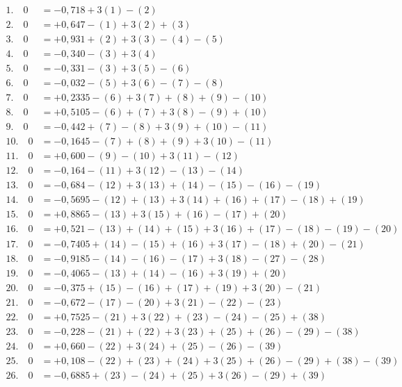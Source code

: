 \documentclass[12pt,a4paper]{article}
\theoremstyle{plain}
\theoremstyle{definition}
\theoremstyle{remark}
\begin{document}
\begin{align*}
1.\quad 0 &= -0{,}718 + 3(1) - (2)\\
2.\quad 0 &= +0{,}647 - (1) + 3(2) + (3)\\
3.\quad 0 &= +0{,}931 + (2) + 3(3) - (4) - (5)\\
4.\quad 0 &= -0{,}340 - (3) + 3(4)\\
5.\quad 0 &= -0{,}331 - (3) + 3(5) - (6)\\
6.\quad 0 &= -0{,}032 - (5) + 3(6) - (7) - (8)\\
7.\quad 0 &= +0{,}2335 - (6) + 3(7) + (8) + (9) - (10)\\
8.\quad 0 &= +0{,}5105 - (6) + (7) + 3(8) - (9) + (10)\\
9.\quad 0 &= -0{,}442 + (7) - (8) + 3(9) + (10) - (11)\\
10.\quad 0 &= -0{,}1645 - (7) + (8) + (9) + 3(10) - (11)\\
11.\quad 0 &= +0{,}600 - (9) - (10) + 3(11) - (12)\\
12.\quad 0 &= -0{,}164 - (11) + 3(12) - (13) - (14)\\
13.\quad 0 &= -0{,}684 - (12) + 3(13) + (14) - (15) - (16) - (19)\\
14.\quad 0 &= -0{,}5695 - (12) + (13) + 3(14) + (16) + (17) - (18) + (19)\\
15.\quad 0 &= +0{,}8865 - (13) + 3(15) + (16) - (17) + (20)\\
16.\quad 0 &= +0{,}521 - (13) + (14) + (15) + 3(16) + (17) - (18) - (19) - (20)\\
17.\quad 0 &= -0{,}7405 + (14) - (15) + (16) + 3(17) - (18) + (20) - (21)\\
18.\quad 0 &= -0{,}9185 - (14) - (16) - (17) + 3(18) - (27) - (28)\\
19.\quad 0 &= -0{,}4065 - (13) + (14) - (16) + 3(19) + (20)\\
20.\quad 0 &= -0{,}375 + (15) - (16) + (17) + (19) + 3(20) - (21)\\
21.\quad 0 &= -0{,}672 - (17) - (20) + 3(21) - (22) - (23)\\
22.\quad 0 &= +0{,}7525 - (21) + 3(22) + (23) - (24) - (25) + (38)\\
23.\quad 0 &= -0{,}228 - (21) + (22) + 3(23) + (25) + (26) - (29) - (38)\\
24.\quad 0 &= +0{,}660 - (22) + 3(24) + (25) - (26) - (39)\\
25.\quad 0 &= +0{,}108 - (22) + (23) + (24) + 3(25) + (26) - (29) + (38) - (39)\\
26.\quad 0 &= -0{,}6885 + (23) - (24) + (25) + 3(26) - (29) + (39)\\

\end{align*}
\end{document}
